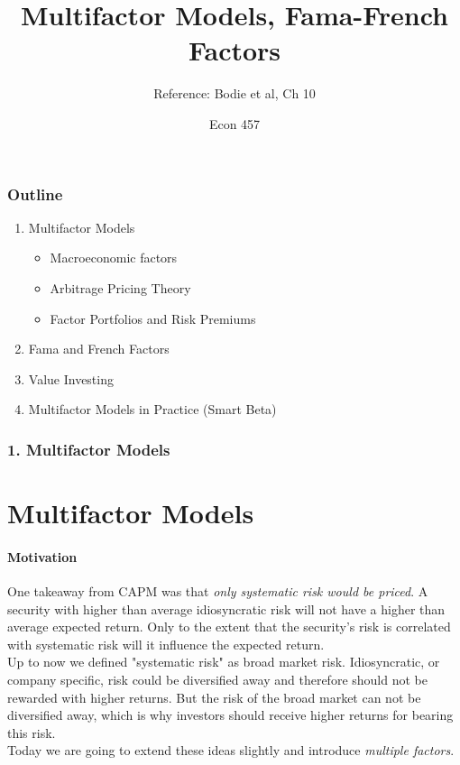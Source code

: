 \documentclass{beamer}
\title{Multifactor Models, Fama-French Factors}
\subtitle{Reference: Bodie et al, Ch 10}
\author{Econ 457}
\date{\week}
\begin{document}
\frame{\titlepage}

\begin{frame}
    \frametitle{Outline}

    \begin{enumerate}
        \item Multifactor Models 
            \begin{itemize}
                \item Macroeconomic factors
                \item Arbitrage Pricing Theory
                \item Factor Portfolios and Risk Premiums
            \end{itemize}
        \item Fama and French Factors
        \item Value Investing
        \item Multifactor Models in Practice (Smart Beta)
    \end{enumerate}
\end{frame}

\begin{frame}[t]
    \frametitle{1. Multifactor Models}
    \section{Multifactor Models}
    \framesubtitle{Motivation}

    One takeaway from CAPM was that \textit{only systematic risk would be priced}.   
    A security with higher than average idiosyncratic risk will not have a higher than 
    average expected return.   Only to the extent that the security's risk is correlated with 
    systematic risk will it influence the expected return.\\
    \vspace{1em}
    Up to now we defined "systematic risk" as broad market risk.   
    Idiosyncratic, or company specific, risk could be diversified away and therefore should not be rewarded with higher returns.   
    But the risk of the broad market can not be diversified away, which is why investors should receive higher returns for bearing this risk.\\
    \vspace{1em}
    Today we are going to extend these ideas slightly and introduce \textit{multiple factors}.

\end{frame}
\end{document}
